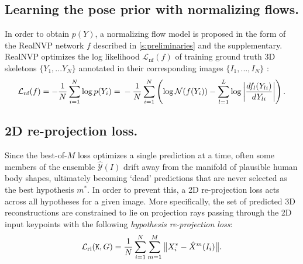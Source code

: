 
\subsection{Learning the pose prior with normalizing flows.}
In order to obtain $p(Y)$, a normalizing flow model is proposed in the form of the RealNVP network $f$ described in \cref{s:preliminaries} and the supplementary. RealNVP optimizes the log likelihood $\mathcal{L}_\text{nf}(f)$ of training ground truth 3D skeletons $\{Y_1, ... Y_N\}$ annotated in their corresponding images $\{I_1, ..., I_N\}$ :
\begin{equation}\label{e:loglik}
\mathcal{L}_\text{nf}(f)
=
-
\frac{1}{N}
\sum_{i=1}^N
\log p(Y_i)
=\\
-
\frac{1}{N}
\sum_{i=1}^N
\left(
\log \mathcal{N}(f(Y_i))
-
\sum_{l=1}^L
\log
\left|
\frac{d f_l(Y_{li})}{d Y_{li}}
\right|
\right).
\end{equation}

\subsection{2D re-projection loss.}

Since the best-of-$M$ loss optimizes a single prediction at a time, often some members of the ensemble $\mathcal{\hat Y}(I)$ drift away from the manifold of plausible human body shapes, ultimately becoming `dead' predictions that are never selected as the best hypothesis $m^*$.
In order to prevent this, a 2D re-projection loss acts across all hypotheses for a given image.
More specifically, the set of predicted 3D reconstructions are constrained to lie on projection rays passing through the 2D input keypoints with the following \emph{hypothesis re-projection loss}:
\begin{equation}\label{e:loss-ri}
  \mathcal{L}_\text{ri}(\mathtt{K},G)
  =
  \frac{1}{N}
  \sum_{i=1}^N
  \sum_{m=1}^M
  \big \| X^*_i - \hat X^m(I_i) \big \|.
\end{equation}

